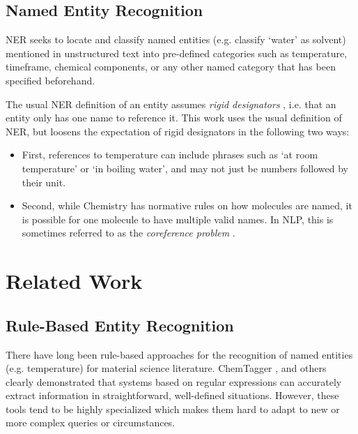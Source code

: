 \subsection{Named Entity Recognition}\label{sub:NER}
\gls{NER} seeks to locate and classify named entities (e.g. classify `water' as solvent) mentioned in unstructured text into pre-defined categories \cite{li_survey_2022} such as temperature, timeframe, chemical components, or any other named category that has been specified beforehand.

The usual \gls{NER} definition of an entity assumes \textit{rigid designators} \cite{laporte_rigid_2022}, i.e. that an entity only has one name to reference it.
This work uses the usual definition of \gls{NER}, but loosens the expectation of rigid designators in the following two ways:

\begin{itemize}
    \item First, references to temperature can include phrases such as `at room temperature' or `in boiling water', and may not just be numbers followed by their unit.
    \item Second, while Chemistry has normative rules on how molecules are named, it is possible for one molecule to have multiple valid names.
In \gls{NLP}, this is sometimes referred to as the \textit{coreference problem} \cite{hobbs_coherence_1979}.
\end{itemize}


\section{Related Work}

\subsection{Rule-Based Entity Recognition}\label{sub:rule-based}
There have long been rule-based approaches for the recognition of named entities (e.g. temperature) for material science literature.
ChemTagger \cite{hawizy_chemicaltagger_2011}, and others \cite{beard_comparative_2019, huang_database_2020}
clearly demonstrated that systems based on regular expressions can accurately extract information in straightforward, well-defined situations.
However, these tools tend to be highly specialized which makes them hard to adapt to new or more complex queries or circumstances.


